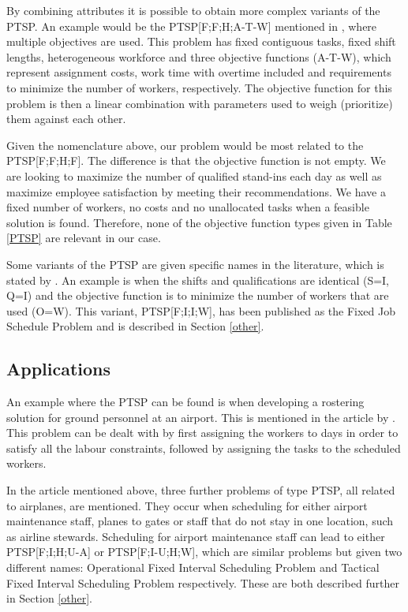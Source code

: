 By combining attributes it is possible to obtain more complex variants of the PTSP. An example would be the PTSP[F;F;H;A-T-W] mentioned in \citet{krishnamoorthy_2001}, where multiple objectives are used. This problem has fixed contiguous tasks, fixed shift lengths, heterogeneous workforce and three objective functions (A-T-W), which represent assignment costs, work time with overtime included and requirements to minimize the number of workers, respectively. The objective function for this problem is then a linear combination with parameters used to weigh (prioritize) them against each other.

Given the nomenclature above, our problem would be most related to the PTSP[F;F;H;F]. The difference is that the objective function is not empty. We are looking to maximize the number of qualified stand-ins each day as well as maximize employee satisfaction by meeting their recommendations. We have a fixed number of workers, no costs and no unallocated tasks when a feasible solution is found. Therefore, none of the objective function types given in Table \ref{PTSP} are relevant in our case.

Some variants of the PTSP are given specific names in the literature, which is stated by \citet{krishnamoorthy_2001}. An example is when the shifts and qualifications are identical (S=I, Q=I) and the objective function is to minimize the number of workers that are used (O=W). This variant, PTSP[F;I;I;W], has been published as the Fixed Job Schedule Problem and is described in Section \ref{other}.

\subsection{Applications}
An example where the PTSP can be found is when developing a rostering solution for ground personnel at an airport. This is mentioned in the article by \citet{krishnamoorthy_2001}. This problem can be dealt with by first assigning the workers to days in order to satisfy all the labour constraints, followed by assigning the tasks to the scheduled workers.

In the article mentioned above, three further problems of type PTSP, all related to airplanes, are mentioned. They occur when scheduling for either airport maintenance staff, planes to gates or staff that do not stay in one location, such as airline stewards. Scheduling for airport maintenance staff can lead to either PTSP[F;I;H;U-A] or PTSP[F;I-U;H;W], which are similar problems but given two different names: Operational Fixed Interval Scheduling Problem and Tactical Fixed Interval Scheduling Problem respectively. These are both described further in Section \ref{other}. 

